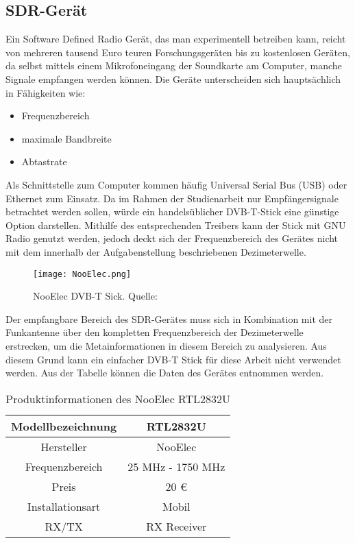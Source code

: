 \subsection{SDR-Gerät} 
Ein Software Defined Radio Gerät, das man experimentell betreiben kann, reicht von mehreren tausend Euro teuren Forschungsgeräten bis zu kostenlosen Geräten, da selbst mittels einem Mikrofoneingang der Soundkarte am Computer, manche Signale empfangen werden können. Die Geräte unterscheiden sich hauptsächlich in Fähigkeiten wie:

\begin{itemize}
	\item Frequenzbereich
	\item maximale Bandbreite
	\item Abtastrate
\end{itemize}

Als Schnittstelle zum Computer kommen häufig Universal Serial Bus (USB) oder Ethernet zum  Einsatz.
Da im Rahmen der Studienarbeit nur Empfängersignale betrachtet werden sollen, würde ein handelsüblicher DVB-T-Stick eine günstige Option darstellen. Mithilfe des entsprechenden Treibers kann der Stick mit GNU Radio genutzt werden, jedoch deckt sich der Frequenzbereich des Gerätes nicht mit dem innerhalb der Aufgabenstellung beschriebenen Dezimeterwelle.\\

\begin{figure}[H]
	\centering
	\texttt{[image: NooElec.png]}
	\caption[NooElec DVB-T Stick]{NooElec DVB-T Sick. Quelle: \cite{NooElec:2018}} 
	\label{NooElec}
\end{figure}

Der empfangbare Bereich des SDR-Gerätes muss sich in Kombination mit der Funkantenne über den kompletten Frequenzbereich der Dezimeterwelle erstrecken, um die Metainformationen in diesem Bereich zu analysieren. Aus diesem Grund kann ein einfacher DVB-T Stick für diese Arbeit nicht verwendet werden. Aus der Tabelle können die Daten des Gerätes entnommen werden.\\

\begin{table}[H]
	\centering
	\begin{tabular}{c|c}
		Modellbezeichnung & RTL2832U\\
		\hline
		Hersteller & NooElec\\ 
		\hline 
		Frequenzbereich & 25 MHz - 1750 MHz \\ 
		\hline 
		Preis & 20 \euro \\ 
		\hline 
		Installationsart & Mobil \\ 
		\hline 
		RX/TX & RX Receiver \\ 
	\end{tabular} 
	\caption{Produktinformationen des NooElec RTL2832U}
\end{table}

